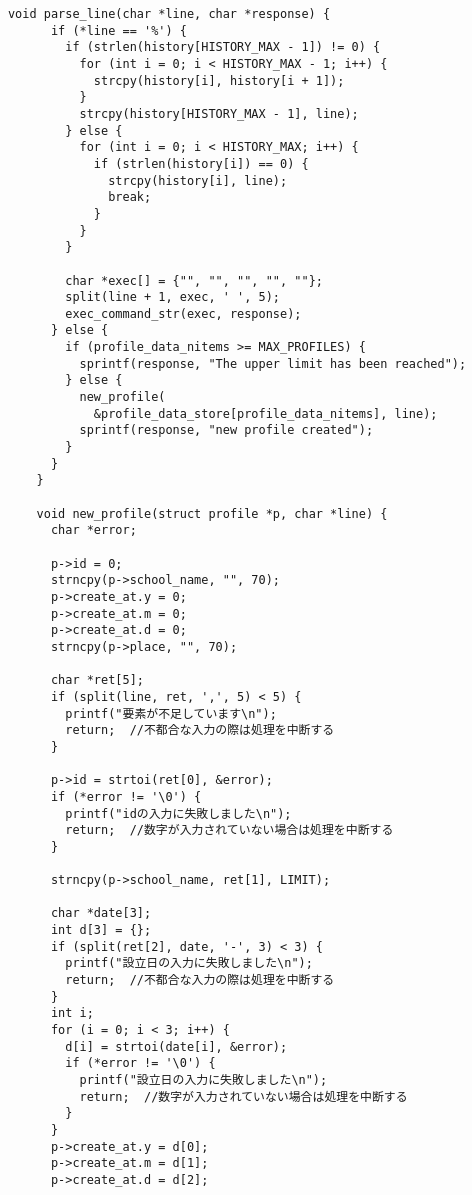 \documentclass[11pt]{jsarticle}
\begin{document}
\begin{verbatim}
      void parse_line(char *line, char *response) {
            if (*line == '%') {
              if (strlen(history[HISTORY_MAX - 1]) != 0) {
                for (int i = 0; i < HISTORY_MAX - 1; i++) {
                  strcpy(history[i], history[i + 1]);
                }
                strcpy(history[HISTORY_MAX - 1], line);
              } else {
                for (int i = 0; i < HISTORY_MAX; i++) {
                  if (strlen(history[i]) == 0) {
                    strcpy(history[i], line);
                    break;
                  }
                }
              }
          
              char *exec[] = {"", "", "", "", ""};
              split(line + 1, exec, ' ', 5);
              exec_command_str(exec, response);
            } else {
              if (profile_data_nitems >= MAX_PROFILES) {
                sprintf(response, "The upper limit has been reached");
              } else {
                new_profile(
                  &profile_data_store[profile_data_nitems], line);
                sprintf(response, "new profile created");
              }
            }
          }
          
          void new_profile(struct profile *p, char *line) {
            char *error;
          
            p->id = 0;
            strncpy(p->school_name, "", 70);
            p->create_at.y = 0;
            p->create_at.m = 0;
            p->create_at.d = 0;
            strncpy(p->place, "", 70);
          
            char *ret[5];
            if (split(line, ret, ',', 5) < 5) {
              printf("要素が不足しています\n");
              return;  //不都合な入力の際は処理を中断する
            }
          
            p->id = strtoi(ret[0], &error);
            if (*error != '\0') {
              printf("idの入力に失敗しました\n");
              return;  //数字が入力されていない場合は処理を中断する
            }
          
            strncpy(p->school_name, ret[1], LIMIT);
          
            char *date[3];
            int d[3] = {};
            if (split(ret[2], date, '-', 3) < 3) {
              printf("設立日の入力に失敗しました\n");
              return;  //不都合な入力の際は処理を中断する
            }
            int i;
            for (i = 0; i < 3; i++) {
              d[i] = strtoi(date[i], &error);
              if (*error != '\0') {
                printf("設立日の入力に失敗しました\n");
                return;  //数字が入力されていない場合は処理を中断する
              }
            }
            p->create_at.y = d[0];
            p->create_at.m = d[1];
            p->create_at.d = d[2];
          

\end{verbatim}
\end{document}
